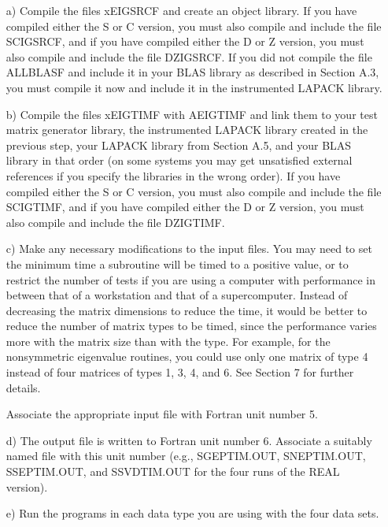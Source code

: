 \begin{itemize}
\item[a)]
Compile the files xEIGSRCF and create an object library.
If you have compiled either the S or C version,
you must also compile and include the file SCIGSRCF, 
and if you have compiled either the D or Z version,
you must also compile and include the file DZIGSRCF.
If you did not compile the file ALLBLASF and include it in your BLAS
library as described in Section A.3, you must compile it now
and include it in the instrumented LAPACK library.

\item[b)]
Compile the files xEIGTIMF with AEIGTIMF and link them to
your test matrix generator library, the instrumented LAPACK library
created in the previous step, your LAPACK library from Section A.5,
and your BLAS library in that order (on some systems you may get
unsatisfied external references
if you specify the libraries in the wrong order).
If you have compiled either the S or C version,
you must also compile and include the file SCIGTIMF, 
and if you have compiled either the D or Z version,
you must also compile and include the file DZIGTIMF.

\item[c)]
Make any necessary modifications to the input files.
You may need to set the minimum time a subroutine will
be timed to a positive value, or to restrict the number of tests
if you are using a computer with performance in between that of a
workstation and that of a supercomputer.
Instead of decreasing the matrix dimensions to reduce the time,
it would be better to reduce the number of matrix types to be timed,
since the performance varies more with the matrix size than with the
type.  For example, for the nonsymmetric eigenvalue routines,
you could use only one matrix of type 4 instead of four matrices of
types 1, 3, 4, and 6.  See Section 7 for further details.

Associate the appropriate input file with Fortran unit number 5.

\item[d)]
The output file is written to Fortran unit number 6.  Associate
a suitably named file with this unit number
(e.g., SGEPTIM.OUT, SNEPTIM.OUT, SSEPTIM.OUT, and
SSVDTIM.OUT for the four runs of the REAL version).

\item[e)]
Run the programs in each data type you are using 
with the four data sets.

\end{itemize}

